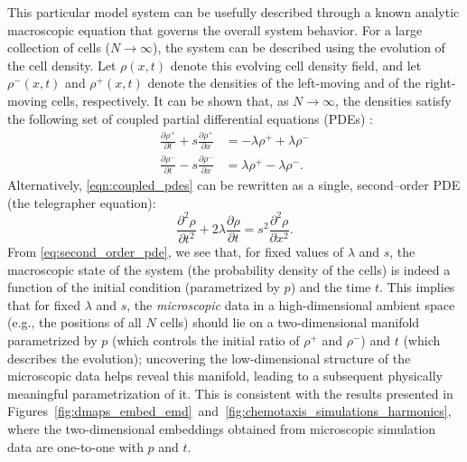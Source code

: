 \documentclass[3p]{elsarticle}
\begin{document}
This particular model system can be usefully described through a known analytic macroscopic equation that governs the overall system behavior.
%
For a large collection of cells ($N \rightarrow \infty$), the system can be described using the evolution of the cell density.
%
Let $\rho(x, t)$ denote this evolving cell density field, and let $\rho^-(x, t)$ and $\rho^+(x, t)$ denote the 
densities of the left-moving and of the right-moving cells, respectively.
%
It can be shown that, as $N \rightarrow \infty$, the densities satisfy the following set of coupled partial differential equations (PDEs) \cite{othmer2000diffusion}:
\begin{equation} \label{eqn:coupled_pdes}
\begin{aligned}
\frac{\partial \rho^+}{\partial t} + s \frac{\partial \rho^+}{\partial x} & = -\lambda \rho^+ +\lambda \rho^- \\
\frac{\partial \rho^-}{\partial t} - s \frac{\partial \rho^-}{\partial x} & = \lambda \rho^+ -\lambda \rho^- .
\end{aligned}
\end{equation}
%
Alternatively, \eqref{eqn:coupled_pdes} can be rewritten as a single, second--order PDE (the telegrapher equation):
\begin{equation} \label{eq:second_order_pde}
\frac{\partial^2 \rho}{\partial t^2} + 2 \lambda \frac{\partial \rho}{\partial t} = s^2 \frac{\partial ^2 \rho}{\partial x^2} .
\end{equation}
%
From \eqref{eq:second_order_pde}, we see that, for fixed values of $\lambda$ and $s$, the macroscopic 
state of the system (the probability density of the cells) is indeed a function of the initial condition (parametrized by $p$) and the time $t$.
%
This implies that for fixed $\lambda$ and $s$, the {\em microscopic} data in a high-dimensional ambient space (e.g., the positions of all $N$ cells) should lie on a two-dimensional manifold parametrized by $p$ (which controls the initial ratio of $\rho^+$ and $\rho^-$) and $t$ (which describes the evolution);
uncovering the low-dimensional structure of the microscopic data helps reveal this manifold, leading to a subsequent physically meaningful
parametrization of it.
%
This is consistent with the results presented in Figures~\ref{fig:dmaps_embed_emd}~and~\ref{fig:chemotaxis_simulations_harmonics}, where the two-dimensional embeddings obtained from microscopic simulation data are one-to-one with $p$ and $t$.
\end{document}
